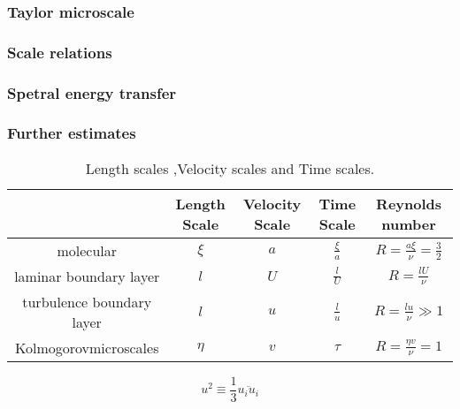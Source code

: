 \documentclass[review]{elsarticle}
\numberwithin{equation}{section}
\begin{document}
		\subsubsection{Taylor microscale}
		\subsubsection{Scale relations}
		\subsubsection{Spetral energy transfer}
		\subsubsection{Further estimates}
	
	
	
	
	
	
\newpage
{}	
\begin {center}
	\begin{table}[!htb]
		\centering
		\begin{tabular}{|c|c|c|c|c|}
			\hline
		 	& Length Scale& Velocity Scale & Time Scale & Reynolds number\\
			\hline
			molecular & $\xi$ & $a$ & $\frac{\xi}{a}$ & $R=\frac{a\xi}{\nu}=\frac{3}{2}$\\
			\hline
			laminar boundary layer & $l$ & $U$ & $\frac{l}{U}$ & $R=\frac{lU}{\nu}$ \\
			\hline
			turbulence boundary layer & $l$ & $u$ & $\frac{l}{u}$ & $R=\frac{lu}{\nu}\gg 1$\\
			\hline
			Kolmogorovmicroscales & $\eta$ & $v$ & $\tau$ & $R=\frac{\eta v}{\nu}=1$\\
			\hline
		\end{tabular}
		\caption{\label{scales} Length scales ,Velocity scales and Time scales.}
	\end{table}
\end{center}

	\begin{equation}
		u^2 \equiv \frac{1}{3}\overline{u_iu_i}
	\end{equation}
\end{document}
